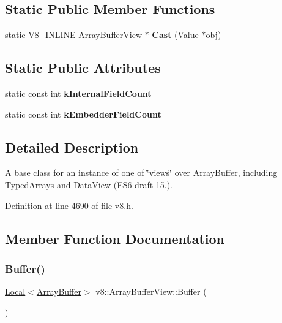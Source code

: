 \subsection*{Static Public Member Functions}
\begin{DoxyCompactItemize}
\item 
\mbox{\label{classv8_1_1ArrayBufferView_a84db315fe904ca1421c0e8e3f615cccb}} 
static V8\+\_\+\+I\+N\+L\+I\+NE \mbox{\hyperlink{classv8_1_1ArrayBufferView}{Array\+Buffer\+View}} $\ast$ {\bfseries Cast} (\mbox{\hyperlink{classv8_1_1Value}{Value}} $\ast$obj)
\end{DoxyCompactItemize}
\subsection*{Static Public Attributes}
\begin{DoxyCompactItemize}
\item 
static const int {\bfseries k\+Internal\+Field\+Count}
\item 
static const int {\bfseries k\+Embedder\+Field\+Count}
\end{DoxyCompactItemize}


\subsection{Detailed Description}
A base class for an instance of one of \char`\"{}views\char`\"{} over \mbox{\hyperlink{classv8_1_1ArrayBuffer}{Array\+Buffer}}, including Typed\+Arrays and \mbox{\hyperlink{classv8_1_1DataView}{Data\+View}} (E\+S6 draft 15.). 

Definition at line 4690 of file v8.\+h.



\subsection{Member Function Documentation}
\mbox{\label{classv8_1_1ArrayBufferView_a2ceba3908fbf98ecc81702083127b046}} 
\subsubsection{\texorpdfstring{Buffer()}{Buffer()}}
{\footnotesize\ttfamily \mbox{\hyperlink{classv8_1_1Local}{Local}}$<$\mbox{\hyperlink{classv8_1_1ArrayBuffer}{Array\+Buffer}}$>$ v8\+::\+Array\+Buffer\+View\+::\+Buffer (\begin{DoxyParamCaption}{ }\end{DoxyParamCaption})}

